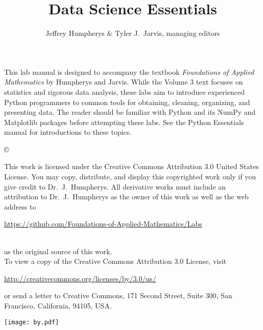 \documentclass[opener-c,labs,grey,nociteref]{HJnewsiambook}
\title{Data Science Essentials}
\author{Jeffrey Humpherys \& Tyler J.~Jarvis, managing editors}
\begin{document}

\thispagestyle{empty} %
\maketitle
\thispagestyle{empty}
\frontmatter



\begin{thepreface} %

This lab manual is designed to accompany the textbook \emph{Foundations of Applied Mathematics} by Humpherys and Jarvis.
While the Volume 3 text focuses on statistics and rigorous data analysis, these labs aim to introduce experienced Python programmers to common tools for obtaining, cleaning, organizing, and presenting data.
The reader should be familiar with Python \cite{vanrossum2010python} and its NumPy \cite{oliphant2006guide,ascher2001numerical,oliphant2007python} and Matplotlib \cite{Hunter:2007} packages before attempting these labs.
See the Python Essentials manual for introductions to these topics.

\vfill
\copyright{This work is licensed under the Creative Commons Attribution 3.0 United States License.
You may copy, distribute, and display this copyrighted work only if you give credit to Dr.~J.~Humpherys.
All derivative works must include an attribution to Dr.~J.~Humpherys as the owner of this work as well as the web address to
\\\centerline{\url{https://github.com/Foundations-of-Applied-Mathematics/Labs}}\\as the original source of this work.
\\To view a copy of the Creative Commons Attribution 3.0 License, visit
\\\centerline{\url{http://creativecommons.org/licenses/by/3.0/us/}} or send a letter to Creative Commons, 171 Second Street, Suite 300, San Francisco, California, 94105, USA.}

\vfill
\centering\texttt{[image: by.pdf]}
\vfill
\end{thepreface}

\setcounter{tocdepth}{1}
\tableofcontents

\mainmatter %
\end{document}
